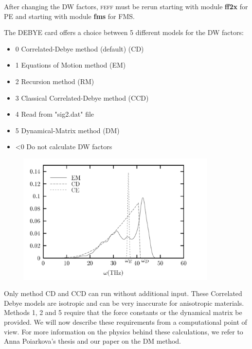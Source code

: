 \documentclass[11pt,oneside]{report} %
\renewcommand{\htmlref}[2]{\hyperlink{#2}{#1}}
\newcommand{\program}[1]{\textsc{#1}}
\newcommand{\feff}{\program{feff}}
\newcommand{\module}[1]{\textrm{\bf{#1}}}
\renewcommand{\htmlref}[2]{{#1}} %
\begin{document}
After changing the DW factors, {\feff} must be rerun starting with module \module{ff2x} for PE and starting with module \module{fms} for FMS.

The \htmlref{DEBYE}{car:deb2} card offers a choice between 5 different models for the DW factors:
\begin{itemize}
				\item  0	Correlated-Debye method  (default) (CD)
				\item  1	Equations of Motion method (EM)
				\item  2	Recursion method (RM)
				\item  3	Classical Correlated-Debye method (CCD)
				\item  4	Read from "sig2.dat" file
				\item  5	Dynamical-Matrix method (DM)
				\item <0	Do not calculate DW factors
\end{itemize}

\begin{figure}[H]
	\centering
		\includegraphics[height=2.6in]{annafig2.pdf}
	\label{fig:DWAnnaCompares}
\end{figure}


Only method CD and CCD can run without additional input.  These Correlated Debye models are isotropic and can be very inaccurate for anisotropic materials.
Methods 1, 2 and 5 require that
the force constants or the dynamical matrix be provided.  We will now describe these requirements from a computational point of view.  For more information on the physics
behind these calculations, we refer to \htmlref{Anna Poiarkova's thesis}{http://leonardo.phys.washington.edu/feff/papers/dissertations/thesis_poiarkova.ps} and our \htmlref{paper on the DM method}{http://leonardo.phys.washington.edu/feff/papers/fdv-ab-initio-dw-factors.pdf}.  
\end{document}
